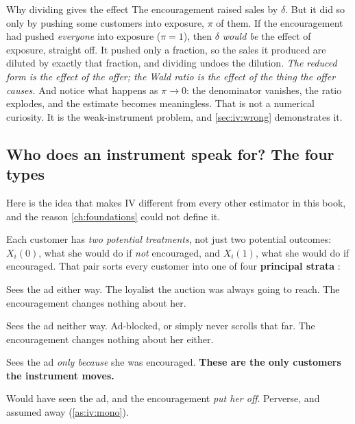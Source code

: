 \begin{intuition}{Why dividing gives the effect}
The encouragement raised sales by $\delta$. But it did so only by pushing some customers into
exposure, $\pi$ of them. If the encouragement had pushed \emph{everyone} into exposure
($\pi = 1$), then $\delta$ \emph{would be} the effect of exposure, straight off. It pushed only a
fraction, so the sales it produced are diluted by exactly that fraction, and dividing undoes the
dilution. \emph{The reduced form is the effect of the offer; the Wald ratio is the effect of the
thing the offer causes.} And notice what happens as $\pi \to 0$: the denominator vanishes, the
ratio explodes, and the estimate becomes meaningless. That is not a numerical curiosity. It is
the weak-instrument problem, and \cref{sec:iv:wrong} demonstrates it.
\end{intuition}



\subsection*{Who does an instrument speak for? The four types}

Here is the idea that makes IV different from every other estimator in this book, and the reason
\cref{ch:foundations} could not define it.

Each customer has \emph{two potential treatments}, not just two potential outcomes: $X_i(0)$, what
she would do if \emph{not} encouraged, and $X_i(1)$, what she would do if encouraged. That pair
sorts every customer into one of four \textbf{principal strata} \citep{angrist1996, imbens1994}:

\begin{description}[leftmargin=*, style=nextline]
  \item[Always-taker \textmd{:} $X(0) = 1,\ X(1) = 1$.]
    Sees the ad either way. The loyalist the auction was always going to reach. The encouragement
    changes nothing about her.
  \item[Never-taker \textmd{:} $X(0) = 0,\ X(1) = 0$.]
    Sees the ad neither way. Ad-blocked, or simply never scrolls that far. The encouragement
    changes nothing about her either.
  \item[Complier \textmd{:} $X(0) = 0,\ X(1) = 1$.]
    Sees the ad \emph{only because} she was encouraged. \textbf{These are the only customers the
    instrument moves.}
  \item[Defier \textmd{:} $X(0) = 1,\ X(1) = 0$.]
    Would have seen the ad, and the encouragement \emph{put her off}. Perverse, and assumed away
    (\cref{as:iv:mono}).
\end{description}

